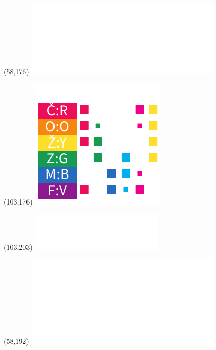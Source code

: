 \documentclass{extarticle}
\begin{document}
\begin{textblock}{0}(58,176)%
\vfill
{\includegraphics[scale=0.7]{tools/rosicrucian-polish-v2.pdf}}
\vfill
\end{textblock}

\begin{textblock}{0}(103,176)%
\vfill
{\includegraphics[scale=0.7]{tools/rainbow-v2.pdf}}
\vfill
\end{textblock}

\begin{textblock}{0}(103,203)%
\vfill
{\includegraphics[scale=0.7]{tools/digits.pdf}}
\vfill
\end{textblock}

\begin{textblock}{0}(58,192)%
\vfill
{\includegraphics[scale=0.7]{tools/keyboard.pdf}}
\vfill
\end{textblock}
\end{document}
